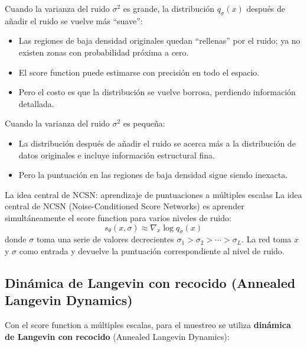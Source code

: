Cuando la varianza del ruido $\sigma^2$ es grande, la distribución $q_\sigma(x)$ después de añadir el ruido se vuelve más ``suave'':
\begin{itemize}
    \item Las regiones de baja densidad originales quedan ``rellenas'' por el ruido; ya no existen zonas con probabilidad próxima a cero.
    \item El score function puede estimarse con precisión en todo el espacio.
    \item Pero el costo es que la distribución se vuelve borrosa, perdiendo información detallada.
\end{itemize}

Cuando la varianza del ruido $\sigma^2$ es pequeña:
\begin{itemize}
    \item La distribución después de añadir el ruido se acerca más a la distribución de datos originales e incluye información estructural fina.
    \item Pero la puntuación en las regiones de baja densidad sigue siendo inexacta.
\end{itemize}

\begin{importantbox}{La idea central de NCSN: aprendizaje de puntuaciones a múltiples escalas}
La idea central de NCSN (Noise-Conditioned Score Networks) es aprender simultáneamente el score function para varios niveles de ruido:
$$s_\theta(x, \sigma) \approx \nabla_x \log q_\sigma(x)$$
donde $\sigma$ toma una serie de valores decrecientes $\sigma_1 > \sigma_2 > \cdots > \sigma_L$. La red toma $x$ y $\sigma$ como entrada y devuelve la puntuación correspondiente al nivel de ruido.
\end{importantbox}

\subsection{Dinámica de Langevin con recocido (Annealed Langevin Dynamics)}

Con el score function a múltiples escalas, para el muestreo se utiliza \textbf{dinámica de Langevin con recocido} (Annealed Langevin Dynamics):

